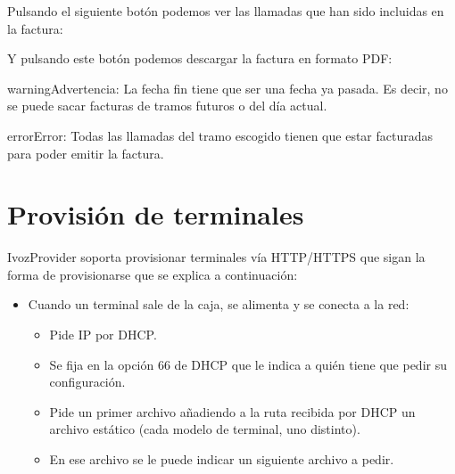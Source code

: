 \documentclass[letterpaper,10pt,spanish]{sphinxmanual}
\begin{document}
Pulsando el siguiente botón podemos ver las llamadas que han sido incluidas en la factura:


Y pulsando este botón podemos descargar la factura en formato PDF:


\begin{notice}{warning}{Advertencia:}
La fecha fin tiene que ser una fecha ya pasada. Es decir, no se puede sacar facturas de tramos futuros o del día actual.
\end{notice}

\begin{notice}{error}{Error:}
Todas las llamadas del tramo escogido tienen que estar facturadas para poder emitir la factura.
\end{notice}


\chapter{Provisión de terminales}
\label{provisioning/index:terminal-provisioning}\label{provisioning/index::doc}\label{provisioning/index:provisioning}
IvozProvider soporta provisionar terminales vía HTTP/HTTPS que sigan la forma de provisionarse que se explica a continuación:
\begin{itemize}
\item {} 
Cuando un terminal sale de la caja, se alimenta y se conecta a la red:
\begin{itemize}
\item {} 
Pide IP por DHCP.

\item {} 
Se fija en la opción 66 de DHCP que le indica a quién tiene que pedir su configuración.

\item {} 
Pide un primer archivo añadiendo a la ruta recibida por DHCP un archivo estático (cada modelo de terminal, uno distinto).

\item {} 
En ese archivo se le puede indicar un siguiente archivo a pedir.

\end{itemize}

\end{itemize}
\end{document}
